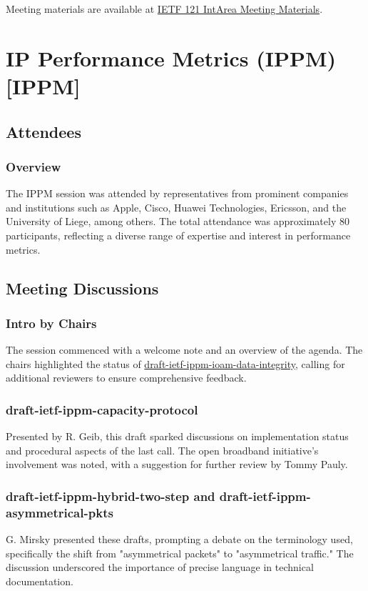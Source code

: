 \documentclass{article}
\begin{document}
Meeting materials are available at \href{https://www.ietf.org/proceedings/121/intarea.html}{IETF 121 IntArea Meeting Materials}.



\newpage

\section{IP Performance Metrics (IPPM) [IPPM]}

\subsection{Attendees}
\subsubsection{Overview}
The IPPM session was attended by representatives from prominent companies and institutions such as Apple, Cisco, Huawei Technologies, Ericsson, and the University of Liege, among others. The total attendance was approximately 80 participants, reflecting a diverse range of expertise and interest in performance metrics.

\subsection{Meeting Discussions}

\subsubsection{Intro by Chairs}
The session commenced with a welcome note and an overview of the agenda. The chairs highlighted the status of \href{https://datatracker.ietf.org/doc/html/draft-ietf-ippm-ioam-data-integrity}{draft-ietf-ippm-ioam-data-integrity}, calling for additional reviewers to ensure comprehensive feedback.

\subsubsection{draft-ietf-ippm-capacity-protocol}
Presented by R. Geib, this draft sparked discussions on implementation status and procedural aspects of the last call. The open broadband initiative's involvement was noted, with a suggestion for further review by Tommy Pauly.

\subsubsection{draft-ietf-ippm-hybrid-two-step and draft-ietf-ippm-asymmetrical-pkts}
G. Mirsky presented these drafts, prompting a debate on the terminology used, specifically the shift from "asymmetrical packets" to "asymmetrical traffic." The discussion underscored the importance of precise language in technical documentation.
\end{document}
